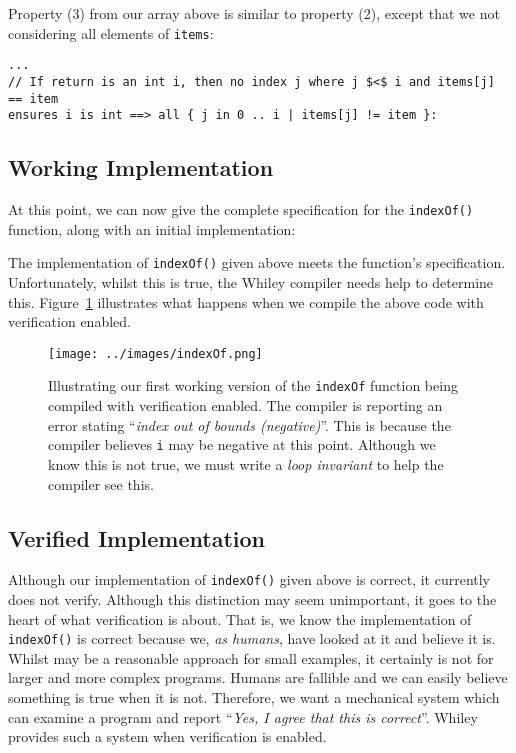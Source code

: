 Property (3) from our array above is similar to property (2), except
that we not considering all elements of \lstinline{items}:

\begin{lstlisting}
...
// If return is an int i, then no index j where j $<$ i and items[j] == item
ensures i is int ==> all { j in 0 .. i | items[j] != item }:
\end{lstlisting}

\subsection{Working Implementation}

At this point, we can now give the complete specification for the
\lstinline{indexOf()} function, along with an initial implementation:



The implementation of \lstinline{indexOf()} given above meets the
function's specification.  Unfortunately, whilst this is true, the
Whiley compiler needs help to determine this.  Figure~\ref{eg_indexOf}
illustrates what happens when we compile the above code with
verification enabled.

\begin{figure}[!t]
\centering
\texttt{[image: ../images/indexOf.png]}
\caption{Illustrating our first working version of the
  \lstinline{indexOf} function being compiled with verification
  enabled.  The compiler is reporting an error stating ``{\em index out of
  bounds (negative)}''.  This is because the compiler believes
  \lstinline{i} may be negative at this point.  Although we know this
  is not true, we must write a {\em loop invariant} to help the
  compiler see this.}
\label{eg_indexOf}
\end{figure}

\subsection{Verified Implementation}
Although our implementation of \lstinline{indexOf()} given above is
correct, it currently does not verify.  Although this distinction may
seem unimportant, it goes to the heart of what verification is about.
That is, we know the implementation of \lstinline{indexOf()} is
correct because we, {\em as humans}, have looked at it and believe it
is.  Whilst may be a reasonable approach for small examples, it
certainly is not for larger and more complex programs.  Humans are
fallible and we can easily believe something is true when it is not.
Therefore, we want a mechanical system which can examine a program and
report ``{\em Yes, I agree that this is correct}''.  Whiley provides
such a system when verification is enabled.  

